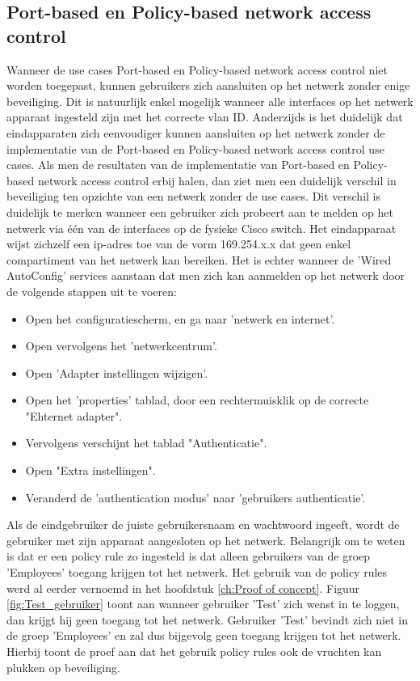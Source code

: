 \subsection{Port-based en Policy-based network access control}
Wanneer de use cases Port-based en Policy-based network access control niet worden toegepast, kunnen gebruikers zich aansluiten op het netwerk zonder enige beveiliging. Dit is natuurlijk enkel mogelijk wanneer alle interfaces op het netwerk apparaat ingesteld zijn met het correcte vlan ID. Anderzijds is het duidelijk dat eindapparaten zich eenvoudiger kunnen aansluiten op het netwerk zonder de implementatie van de Port-based en Policy-based network access control use cases.
Als men de resultaten van de implementatie van Port-based en Policy-based network access control erbij halen, dan ziet men een duidelijk verschil in beveiliging ten opzichte van een netwerk zonder de use cases. Dit verschil is duidelijk te merken wanneer een gebruiker zich probeert aan te melden op het netwerk via één van de interfaces op de fysieke Cisco switch. Het eindapparaat wijst zichzelf een ip-adres toe van de vorm 169.254.x.x dat geen enkel compartiment van het netwerk kan bereiken. 
\newline
\newline
Het is echter wanneer de 'Wired AutoConfig' services aanstaan dat men zich kan aanmelden op het netwerk door de volgende stappen uit te voeren: 
\begin{itemize}
	\item Open het configuratiescherm, en ga naar 'netwerk en internet'.
	\item Open vervolgens het 'netwerkcentrum'.
	\item Open 'Adapter instellingen wijzigen'.
	\item Open het 'properties' tablad, door een rechtermuisklik op de correcte "Ehternet adapter".
	\item Vervolgens verschijnt het tablad "Authenticatie".
	\item Open "Extra instellingen".
	\item Veranderd de 'authentication modus' naar 'gebruikers authenticatie'.
\end{itemize}

Als de eindgebruiker de juiste gebruikersnaam en wachtwoord ingeeft, wordt de gebruiker met zijn apparaat aangesloten op het netwerk. Belangrijk om te weten is dat er een policy rule zo ingesteld is dat alleen gebruikers van de groep 'Employees' toegang krijgen tot het netwerk. Het gebruik van de policy rules werd al eerder vernoemd in het hoofdstuk \ref{ch:Proof of concept}.
Figuur \ref{fig:Test_gebruiker} toont aan wanneer gebruiker 'Test' zich wenst in te loggen, dan krijgt hij geen toegang tot het netwerk. Gebruiker 'Test' bevindt zich niet in de groep 'Employees' en zal dus bijgevolg geen toegang krijgen tot het netwerk. Hierbij toont de proef aan dat het gebruik policy rules ook de vruchten kan plukken op beveiliging.

